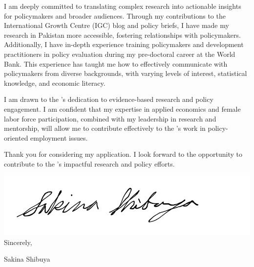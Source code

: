 \documentclass[12pt]{letter}
\begin{document}
I am deeply committed to translating complex research into actionable insights for policymakers and broader audiences. 
Through my contributions to the International Growth Centre (IGC) blog and policy briefs, I have made my research in Pakistan more accessible, 
fostering relationships with policymakers. Additionally, I have in-depth experience training policymakers and development practitioners 
in policy evaluation during my pre-doctoral career at the World Bank. This experience has taught me how to effectively communicate 
with policymakers from diverse backgrounds, with varying levels of interest, statistical knowledge, and economic literacy.

I am drawn to the \instName's dedication to evidence-based research and policy engagement. I am confident that my expertise 
in applied economics and female labor force participation, combined with my leadership in research and mentorship, 
will allow me to contribute effectively to the \instName's work in policy-oriented employment issues.

Thank you for considering my application. I look forward to the opportunity to contribute to the \instName's 
impactful research and policy efforts.

\bigskip

\includegraphics[height=4\baselineskip]{signature.png}  \\

\vspace*{-6.5\baselineskip}Sincerely, 

\vspace{2.5\baselineskip}Sakina Shibuya
\end{document}
